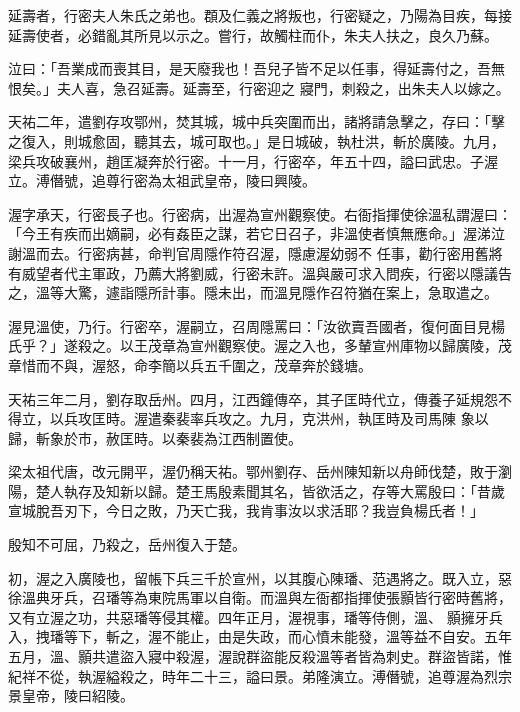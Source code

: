 \begin{pinyinscope}
 延壽者，行密夫人朱氏之弟也。頵及仁義之將叛也，行密疑之，乃陽為目疾，每接延壽使者，必錯亂其所見以示之。嘗行，故觸柱而仆，朱夫人扶之，良久乃蘇。



 泣曰：「吾業成而喪其目，是天廢我也！吾兒子皆不足以任事，得延壽付之，吾無恨矣。」夫人喜，急召延壽。延壽至，行密迎之
 寢門，刺殺之，出朱夫人以嫁之。



 天祐二年，遣劉存攻鄂州，焚其城，城中兵突圍而出，諸將請急擊之，存曰：「擊之復入，則城愈固，聽其去，城可取也。」是日城破，執杜洪，斬於廣陵。九月，梁兵攻破襄州，趙匡凝奔於行密。十一月，行密卒，年五十四，謚曰武忠。子渥立。溥僭號，追尊行密為太祖武皇帝，陵曰興陵。



 渥字承天，行密長子也。行密病，出渥為宣州觀察使。右衙指揮使徐溫私謂渥曰：「今王有疾而出嫡嗣，必有姦臣之謀，若它日召子，非溫使者慎無應命。」渥涕泣謝溫而去。行密病甚，命判官周隱作符召渥，隱慮渥幼弱不
 任事，勸行密用舊將有威望者代主軍政，乃薦大將劉威，行密未許。溫與嚴可求入問疾，行密以隱議告之，溫等大驚，遽詣隱所計事。隱未出，而溫見隱作召符猶在案上，急取遣之。



 渥見溫使，乃行。行密卒，渥嗣立，召周隱罵曰：「汝欲賣吾國者，復何面目見楊氏乎？」遂殺之。以王茂章為宣州觀察使。渥之入也，多輦宣州庫物以歸廣陵，茂章惜而不與，渥怒，命李簡以兵五千圍之，茂章奔於錢塘。



 天祐三年二月，劉存取岳州。四月，江西鐘傳卒，其子匡時代立，傳養子延規怨不得立，以兵攻匡時。渥遣秦裴率兵攻之。九月，克洪州，執匡時及司馬陳
 象以歸，斬象於市，赦匡時。以秦裴為江西制置使。



 梁太祖代唐，改元開平，渥仍稱天祐。鄂州劉存、岳州陳知新以舟師伐楚，敗于瀏陽，楚人執存及知新以歸。楚王馬殷素聞其名，皆欲活之，存等大罵殷曰：「昔歲宣城脫吾刃下，今日之敗，乃天亡我，我肯事汝以求活耶？我豈負楊氏者！」



 殷知不可屈，乃殺之，岳州復入于楚。



 初，渥之入廣陵也，留帳下兵三千於宣州，以其腹心陳璠、范遇將之。既入立，惡徐溫典牙兵，召璠等為東院馬軍以自衛。而溫與左衙都指揮使張顥皆行密時舊將，又有立渥之功，共惡璠等侵其權。四年正月，渥視事，璠等侍側，溫、
 顥擁牙兵入，拽璠等下，斬之，渥不能止，由是失政，而心憤未能發，溫等益不自安。五年五月，溫、顥共遣盜入寢中殺渥，渥說群盜能反殺溫等者皆為刺史。群盜皆諾，惟紀祥不從，執渥縊殺之，時年二十三，謚曰景。弟隆演立。溥僭號，追尊渥為烈宗景皇帝，陵曰紹陵。




\end{pinyinscope}
